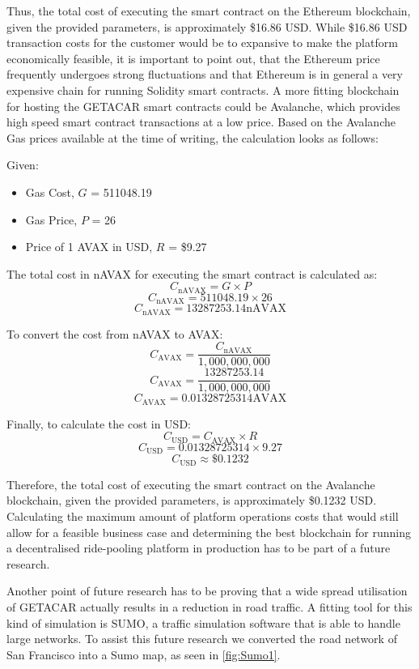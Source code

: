 Thus, the total cost of executing the smart contract on the Ethereum blockchain, given the provided parameters, is approximately \$16.86 USD. While \$16.86 USD transaction costs for the customer would be to expansive to make the platform economically feasible, it is important to point out, that the Ethereum price frequently undergoes strong fluctuations and that Ethereum is in general a very expensive chain for running Solidity smart contracts. A more fitting blockchain for hosting the GETACAR smart contracts could be Avalanche, which provides high speed smart contract transactions at a low price. Based on the Avalanche Gas prices available at the time of writing, the calculation looks as follows:

Given:
\begin{itemize}
    \item Gas Cost, \( G \) = 511048.19
    \item Gas Price, \( P \) = 26 
    \item Price of 1 AVAX in USD, \( R \) = \$9.27
\end{itemize}

The total cost in nAVAX for executing the smart contract is calculated as:
\[ C_{\text{nAVAX}} = G \times P \]
\[ C_{\text{nAVAX}} = 511048.19 \times 26 \]
\[ C_{\text{nAVAX}} = 13287253.14 \text{nAVAX} \]

To convert the cost from nAVAX to AVAX:
\[ C_{\text{AVAX}} = \frac{C_{\text{nAVAX}}}{1,000,000,000} \]
\[ C_{\text{AVAX}} = \frac{13287253.14}{1,000,000,000} \]
\[ C_{\text{AVAX}} = 0.01328725314 \text{AVAX} \]

Finally, to calculate the cost in USD:
\[ C_{\text{USD}} = C_{\text{AVAX}} \times R \]
\[ C_{\text{USD}} = 0.01328725314 \times 9.27 \]
\[ C_{\text{USD}} \approx \$0.1232 \]

Therefore, the total cost of executing the smart contract on the Avalanche blockchain, given the provided parameters, is approximately \$0.1232 USD. Calculating the maximum amount of platform operations costs that would still allow for a feasible business case and determining the best blockchain for running a decentralised ride-pooling platform in production has to be part of a future research. 

Another point of future research has to be proving that a wide spread utilisation of GETACAR actually results in a reduction in road traffic. A fitting tool for this kind of simulation is SUMO, a  traffic simulation software that is able to handle large networks. To assist this future research we converted the road network of San Francisco into a Sumo map, as seen in \ref{fig:Sumo1}. 

